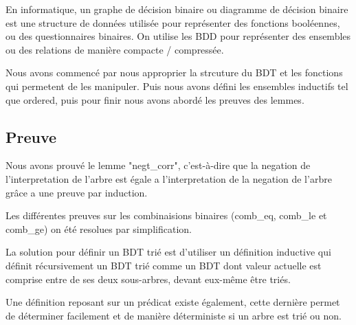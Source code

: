 \documentclass{article}
\begin{document}
En informatique, un graphe de décision binaire ou diagramme de décision binaire
est une structure de données utilisée pour représenter des fonctions booléennes, ou des questionnaires binaires. On utilise les BDD pour représenter des ensembles ou des relations de manière compacte / compressée.

Nous avons commencé par nous approprier la strcuture du BDT et les fonctions qui permetent de les manipuler. Puis nous avons défini les ensembles inductifs tel que ordered, puis pour finir nous avons abordé les preuves des lemmes.

\subsection{Preuve}

Nous avons prouvé le lemme "negt\_corr", c'est-à-dire que la negation de
l'interpretation de l'arbre est égale a l'interpretation de la negation de
l'arbre grâce a une preuve par induction.

Les différentes preuves sur les combinaisions binaires (comb\_eq, comb\_le et
comb\_ge) on été resolues par simplification.

La solution pour définir un BDT trié est d'utiliser un définition
inductive qui définit récursivement un BDT trié comme un BDT dont valeur actuelle est comprise entre de ses deux sous-arbres, devant eux-même être triés.

Une définition reposant sur un prédicat existe également, cette dernière permet de déterminer facilement et de manière déterministe si un arbre est trié ou non.
\end{document}
